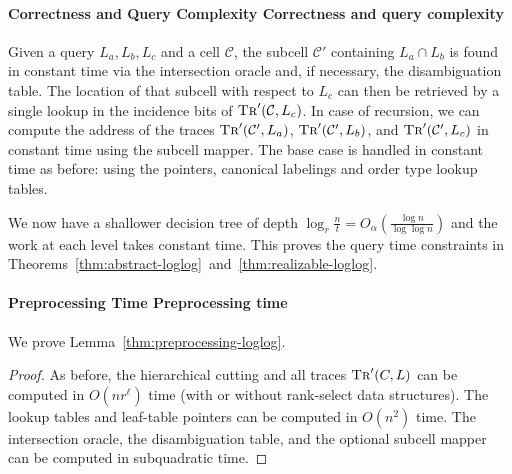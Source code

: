 \paragraph*{\iftitlecase%
Correctness and Query Complexity\else%
Correctness and query complexity\fi}
Given a query \(L_a, L_b, L_c\) and a cell \(\mathcal{C}\),
the subcell \(\mathcal{C}'\) containing \(L_a \cap L_b\) is found in constant
time via the
intersection oracle and, if necessary, the disambiguation table.
The location of that subcell with respect to \(L_c\) can then be retrieved by
a single lookup in the incidence bits of \(\textsc{Tr}'(\mathcal{C}, L_c)\).
In case of recursion, we can compute the address of the traces
\(\textsc{Tr}'(\mathcal{C}', L_a)\),
\(\textsc{Tr}'(\mathcal{C}', L_b)\), and
\(\textsc{Tr}'(\mathcal{C}', L_c)\) in constant time using the subcell mapper.
The base case is handled in constant time as before: using the pointers,
canonical labelings and order type lookup tables.

We now have a shallower decision tree of depth
\(\log_r{\frac{n}{t}} = O_\alpha(\frac{\log{n}}{\log{\log{n}}})\)
and the work at each level takes constant time.
This proves the query time constraints in
Theorems~\ref{thm:abstract-loglog}~and~\ref{thm:realizable-loglog}.

\paragraph*{\iftitlecase%
Preprocessing Time\else%
Preprocessing time\fi}
We prove Lemma~\ref{thm:preprocessing-loglog}.
\begin{proof}
  As before, the hierarchical cutting and all traces \(\textsc{Tr}'(C, L)\)
  can be computed in \(O(nr^\ell)\) time (with or without rank-select data
  structures). The lookup tables and leaf-table pointers can be computed in
  \(O(n^2)\) time. The intersection oracle, the disambiguation table, and the
  optional subcell mapper can be computed in subquadratic time.
\end{proof}
